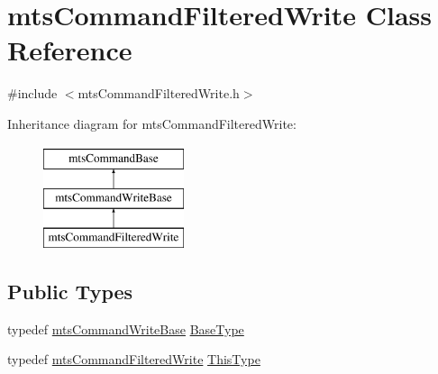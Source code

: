 \hypertarget{classmts_command_filtered_write}{}\section{mts\+Command\+Filtered\+Write Class Reference}
\label{classmts_command_filtered_write}


{\ttfamily \#include $<$mts\+Command\+Filtered\+Write.\+h$>$}

Inheritance diagram for mts\+Command\+Filtered\+Write\+:\begin{figure}[H]
\begin{center}
\leavevmode
\includegraphics[height=3.000000cm]{d3/d7c/classmts_command_filtered_write}
\end{center}
\end{figure}
\subsection*{Public Types}
\begin{DoxyCompactItemize}
\item 
typedef \hyperlink{classmts_command_write_base}{mts\+Command\+Write\+Base} \hyperlink{classmts_command_filtered_write_af0fe1d0192120a875d65d2ba14f665ef}{Base\+Type}
\item 
typedef \hyperlink{classmts_command_filtered_write}{mts\+Command\+Filtered\+Write} \hyperlink{classmts_command_filtered_write_a397cd5406f1cf05ebdf94ec5050dbe20}{This\+Type}
\end{DoxyCompactItemize}
